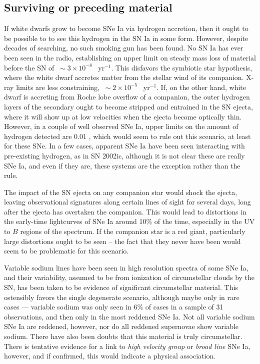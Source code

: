 \documentclass{nature1}
\begin{document}
\subsection{Surviving or preceding material\label{stuff}}
If white dwarfs grow to become SNe Ia via hydrogen accretion, then it
ought to be possible to to see this hydrogen in the SN Ia in some
form.  However, despite decades of searching, no such smoking gun has
been found.  No SN Ia has ever been seen in the
radio\citep{2006ApJ...646..369P}, establishing an upper limit on
steady mass loss of material before the SN of $~\sim 3 \times 10^{-8}$
\Msun\ yr$^{-1}$.  This disfavors the symbiotic star hypothesis, where
the white dwarf accretes matter from the stellar wind of its
companion.  X-ray limits are less
constraining\citep{2007ApJ...670.1260H}, $~\sim 2 \times 10^{-5}$
\Msun\ yr$^{-1}$.  If, on the other hand, white dwarf is accreting
from Roche lobe overflow of a companion, the outer hydrogen layers of
the secondary ought to become stripped and entrained in the SN ejecta,
where it will show up at low velocities when the ejecta become
optically thin\citep{2000ApJS..128..615M}.  However, in a couple of
well observed SNe Ia, upper limits on the amount of hydrogen detected
are 0.01 \Msun , which would seem to rule out this
scenario\citep{2007ApJ...670.1275L}, at least for these SNe.  In a
few cases, apparent SNe Ia have been seen interacting with
pre-existing hydrogen, as in SN 2002ic\citep{2003Natur.424..651H},
although it is not clear these are really SNe
Ia\citep{2006ApJ...653L.129B}, and even if they are, these systems are
the exception rather than the rule.

The impact of the SN ejecta on any companion star would shock the
ejecta, leaving observational signatures along certain lines of sight
for several days, long after the ejecta has overtaken the
companion\citep{2010ApJ...708.1025K}.  This would lead to distortions
in the early-time lightcurves of SNe Ia around 10\% of the time,
especially in the UV to $B$ regions of the spectrum.  If the companion
star is a red giant, particularly large distortions ought to be seen --
the fact that they never have been would seem to be problematic for
this scenario\citep{2010ApJ...722.1691H}.

Variable sodium lines have been seen in high resolution spectra of
some SNe Ia, and their variability, assumed to be from ionization of
circumstellar clouds by the SN, has been taken to be evidence of
significant circumstellar material.  This ostensibly favors the single
degenerate scenario\citep{2007Sci...317..924P}, although maybe only in
rare cases --- variable sodium was only seen in 6\% of cases in a
sample of 31 observations, and then only in the most reddened SNe
Ia\citep{2009ApJ...693..207B}.  Not all variable sodium SNe Ia are
reddened, however, nor do all reddened supernovae show variable
sodium\citep{2009ApJ...702.1157S}.  There have also been doubts that
this material is truly circumstellar\citep{2008AstL...34..389C}.
There is tentative evidence for a link to {\it high velocity
  group}\citep{2005ApJ...623.1011B} or {\it broad
  line}\citep{2009PASP..121..238B} SNe Ia, however, and if confirmed,
this would indicate a physical association\citep{2009ApJ...702.1157S}.
\end{document}
